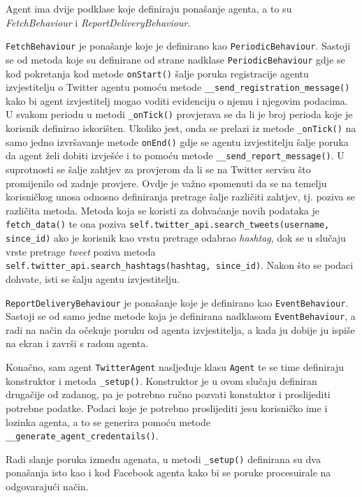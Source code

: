 \documentclass[a4paper,12pt]{foi}
\begin{document}
Agent ima dvije podklase koje definiraju ponašanje agenta, a to su \textit{FetchBehaviour} i \textit{ReportDeliveryBehaviour}.

\texttt{FetchBehaviour} je ponašanje koje je definirano kao \texttt{PeriodicBehaviour}. Sastoji se od metoda koje su definirane od strane nadklase \texttt{PeriodicBehaviour} gdje se kod pokretanja kod metode \texttt{onStart()} šalje poruka registracije agentu izvjestitelju o Twitter agentu pomoću metode \texttt{\_\_send\_registration\_message()}  kako bi agent izvjestitelj mogao voditi evidenciju o njemu i njegovim podacima. U svakom periodu u metodi \texttt{\_onTick()} provjerava se da li je broj perioda koje je korisnik definirao iskorišten. Ukoliko jest, onda se prelazi iz metode \texttt{\_onTick()} na samo jedno izvršavanje metode \texttt{onEnd()} gdje se agentu izvjestitelju šalje poruka da agent želi dobiti izvješće i to pomoću metode \texttt{\_\_send\_report\_message()}. U suprotnosti se šalje zahtjev za provjerom da li se na Twitter servisu što promijenilo od zadnje provjere. Ovdje je važno spomenuti da se na temelju korisničkog unosa odnosno definiranja pretrage šalje različiti zahtjev, tj. poziva se različita metoda. Metoda koja se koristi za dohvaćanje novih podataka je \texttt{fetch\_data()} te ona poziva \texttt{self.twitter\_api.search\_tweets(username, since\_id)} ako je korisnik kao vrstu pretrage odabrao \textit{hashtag}, dok se u slučaju vrste pretrage \textit{tweet} poziva metoda \texttt{self.twitter\_api.search\_hashtags(hashtag, since\_id)}. Nakon što se podaci dohvate, isti se šalju agentu izvjestitelju.

\texttt{ReportDeliveryBehaviour} je ponašanje koje je definirano kao \texttt{EventBehaviour}. Sastoji se od samo jedne metode koja je definirana nadklasom \texttt{EventBehaviour}, a radi na način da očekuje poruku od agenta izvjestitelja, a kada ju dobije ju ispiše na ekran i završi s radom agenta.

Konačno, sam agent \texttt{TwitterAgent} nasljeđuje klasu \texttt{Agent} te se time definiraju konstruktor i metoda \texttt{\_setup()}. Konstruktor je u ovom slučaju definiran drugačije od zadanog, pa je potrebno ručno pozvati konstuktor i proslijediti potrebne podatke. Podaci koje je potrebno proslijediti jesu korisničko ime i lozinka agenta, a to se generira pomoću metode \texttt{\_\_generate\_agent\_credentails()}.

Radi slanje poruka između agenata, u metodi \texttt{\_setup()} definirana su dva ponašanja isto kao i kod Facebook agenta kako bi se poruke procesuirale na odgovarajući način.
\end{document}
